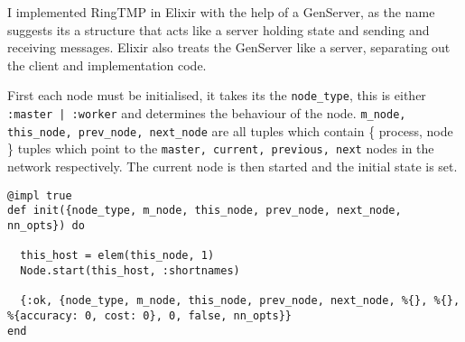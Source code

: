
I implemented RingTMP in Elixir with the help of a GenServer, as the name
suggests its a structure that acts like a server holding state and sending and
receiving messages. Elixir also treats the GenServer like a server, separating
out the client and implementation code.

First each node must be initialised, it takes its the \lstinline{node_type},
this is either \lstinline{:master | :worker} and determines the behaviour of the
node. \lstinline{m_node, this_node, prev_node, next_node} are all tuples which
contain \{ process, node \} tuples which point to the 
\lstinline{master, current, previous, next} nodes in the network respectively.
The current node is then started and the initial state is set.
\begin{lstlisting}
@impl true
def init({node_type, m_node, this_node, prev_node, next_node, nn_opts}) do
  
  this_host = elem(this_node, 1)
  Node.start(this_host, :shortnames)
  
  {:ok, {node_type, m_node, this_node, prev_node, next_node, %{}, %{}, %{accuracy: 0, cost: 0}, 0, false, nn_opts}}
end
\end{lstlisting}

